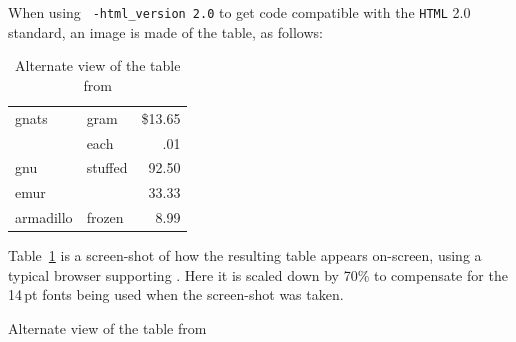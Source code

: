 \begin{htmlonly}
When using \texttt{ -html\_version 2.0} to get code compatible
with the \texttt{HTML} 2.0 standard, an image is made of the
table, as follows:
%
\begin{table}[ht]
\begin{center}
\begin{makeimage}
\begin{tabular}{||l|lr||}   \hline
gnats   &       gram    &       \$13.65  \\ \cline{2-3}
        &       each    &        .01    \\ \hline
gnu     &       stuffed &        92.50  
                \\  \cline{1-1} \cline{3-3}
emur    &               &       33.33   \\ \hline
armadillo       & frozen        &       8.99 \\ \hline
\end{tabular}
\end{makeimage}
\caption{Alternate view of the table from \protect\cite{lamp:latex}}
\label{tab:alt}
\end{center}
\end{table}
\end{htmlonly}
%
\noindent
Table~\ref{tab:alt} is a screen-shot of how the resulting table appears on-screen,
using a typical browser supporting \HTMLiii.
Here it is scaled down by 70\% to compensate for the 14\,pt fonts being used when
the screen-shot was taken.
%
\begin{table}[ht]
\begin{center}
\caption{Alternate view of the table from \protect\cite{lamp:latex}}
\label{tab:alt}
\end{center}
\end{table}

